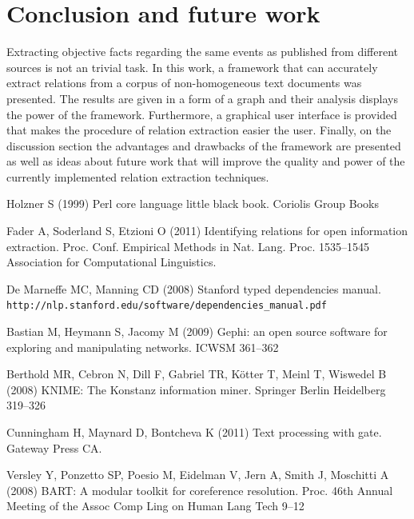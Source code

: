 \documentclass[]{article}
\begin{document}
\section{Conclusion and future work}
%
Extracting objective facts regarding the same events as published from different sources is not an trivial task. In this work, a framework that can accurately extract relations from a corpus of non-homogeneous text documents was presented. The results are given in a form of a graph and their analysis displays the power of the framework. Furthermore, a graphical user interface is provided that makes  the procedure of relation extraction easier the user. Finally, on the discussion section the advantages and drawbacks of the framework are presented as well as ideas about future work that will improve the quality and power of the currently implemented relation extraction techniques.
%
%
\begin{thebibliography}{99}
%

Holzner S (1999)
Perl core language little black book. 
Coriolis Group Books

Fader A, Soderland S, Etzioni O (2011) 
Identifying relations for open information extraction. 
Proc. Conf. Empirical Methods in Nat. Lang. Proc. 1535--1545
Association for Computational Linguistics.

De Marneffe MC, Manning CD (2008)
Stanford typed dependencies manual. \texttt{http://nlp.stanford.edu/software/dependencies\_manual.pdf}

Bastian M, Heymann S, Jacomy M (2009)
Gephi: an open source software for exploring and manipulating networks.
ICWSM 361--362

Berthold MR, Cebron N, Dill F, Gabriel TR, Kötter T, Meinl T, Wiswedel B (2008)
KNIME: The Konstanz information miner.
Springer Berlin Heidelberg 319--326

Cunningham H, Maynard D, Bontcheva K (2011)
Text processing with gate.
Gateway Press CA.

Versley Y, Ponzetto SP, Poesio M, Eidelman V, Jern A, Smith J, Moschitti A (2008)
BART: A modular toolkit for coreference resolution.
Proc. 46th Annual Meeting of the Assoc Comp Ling on Human Lang Tech 9--12

\end{thebibliography}

\clearpage
\appendix
\appendixpage
\end{document}
